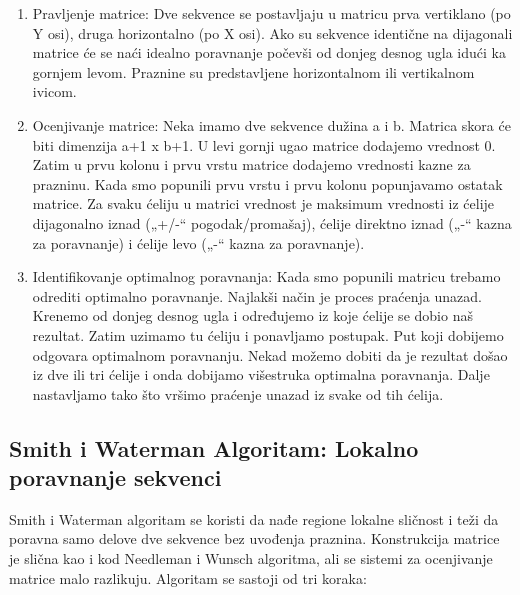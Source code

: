 \begin{enumerate}
\item Pravljenje matrice:  Dve sekvence se postavljaju u matricu prva vertiklano (po Y osi), druga horizontalno (po X osi). Ako su sekvence identične na dijagonali matrice će se naći idealno poravnanje počevši od donjeg desnog ugla idući ka gornjem levom. Praznine su predstavljene horizontalnom ili vertikalnom ivicom.
\item Ocenjivanje matrice: Neka imamo dve sekvence dužina a i b. Matrica skora će biti dimenzija a+1 x b+1. U levi gornji ugao matrice dodajemo vrednost 0. Zatim u prvu kolonu i prvu vrstu matrice dodajemo vrednosti kazne za prazninu. Kada smo popunili prvu vrstu i prvu kolonu popunjavamo ostatak matrice. Za svaku ćeliju u matrici vrednost je maksimum vrednosti iz ćelije dijagonalno iznad („+/-“ pogodak/promašaj), ćelije direktno iznad („-“ kazna za poravnanje) i ćelije levo („-“ kazna za poravnanje).   
\item Identifikovanje optimalnog poravnanja: Kada smo popunili matricu trebamo odrediti optimalno poravnanje. Najlakši način je proces praćenja unazad. Krenemo od donjeg desnog ugla i određujemo iz koje ćelije se dobio naš rezultat. Zatim uzimamo tu ćeliju i ponavljamo postupak. Put koji dobijemo odgovara optimalnom poravnanju. Nekad možemo dobiti da je rezultat došao iz dve ili tri ćelije i onda dobijamo višestruka optimalna poravnanja. Dalje nastavljamo tako što vršimo praćenje unazad iz svake od tih ćelija.  

\end{enumerate} \vspace{5mm}

\subsection{Smith i Waterman Algoritam: Lokalno poravnanje sekvenci}
Smith i Waterman algoritam se koristi da nađe regione lokalne sličnost i teži da poravna samo delove dve sekvence bez uvođenja praznina. Konstrukcija matrice je slična kao i kod Needleman i Wunsch algoritma, ali se sistemi za ocenjivanje matrice malo razlikuju.  Algoritam se sastoji od tri koraka:

